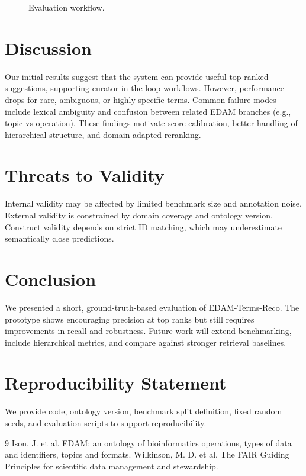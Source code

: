 \documentclass[10pt]{article}
\begin{document}
\begin{figure}[h]
\centering
{}
\caption{Evaluation workflow.}
\label{fig:pipeline}
\end{figure}

\section{Discussion}
Our initial results suggest that the system can provide useful top-ranked suggestions, supporting curator-in-the-loop workflows.
However, performance drops for rare, ambiguous, or highly specific terms.
Common failure modes include lexical ambiguity and confusion between related EDAM branches (e.g., topic vs operation).
These findings motivate score calibration, better handling of hierarchical structure, and domain-adapted reranking.

\section{Threats to Validity}
Internal validity may be affected by limited benchmark size and annotation noise.
External validity is constrained by domain coverage and ontology version.
Construct validity depends on strict ID matching, which may underestimate semantically close predictions.

\section{Conclusion}
We presented a short, ground-truth-based evaluation of EDAM-Terms-Reco.
The prototype shows encouraging precision at top ranks but still requires improvements in recall and robustness.
Future work will extend benchmarking, include hierarchical metrics, and compare against stronger retrieval baselines.

\section*{Reproducibility Statement}
We provide code, ontology version, benchmark split definition, fixed random seeds, and evaluation scripts to support reproducibility.


\begin{thebibliography}{9}
Ison, J. et al. EDAM: an ontology of bioinformatics operations, types of data and identifiers, topics and formats.
Wilkinson, M. D. et al. The FAIR Guiding Principles for scientific data management and stewardship.
\end{thebibliography}
\end{document}
